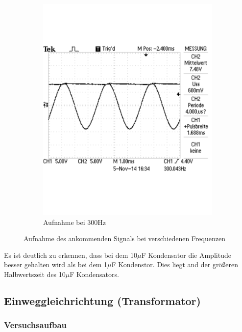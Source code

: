 \documentclass[12pt,a4paper]{article}
\begin{document}
\begin{figure}[H]
\begin{subfigure}[b]{0.48\textwidth}
                \includegraphics[width=\textwidth , scale = 0.4]{2_2_10F_2.pdf}
                \caption[Aufnahme bei 300Hz]{Aufnahme bei 300Hz}
  				\label{fig:2_2_10F_2}
        \end{subfigure}
        \caption{Aufnahme des ankommenden Signals bei verschiedenen Frequenzen}
        \label{fig:2_2_10F}
\end{figure}

Es ist deutlich zu erkennen, dass bei dem 10$\mu$F Kondensator die Amplitude besser gehalten wird als bei dem 1$\mu$F Kondenstor. Dies liegt and der größeren Halbwertszeit des 10$\mu$F Kondensators.

\subsection{Einweggleichrichtung (Transformator)}
\subsubsection{Versuchsaufbau}
\end{document}
